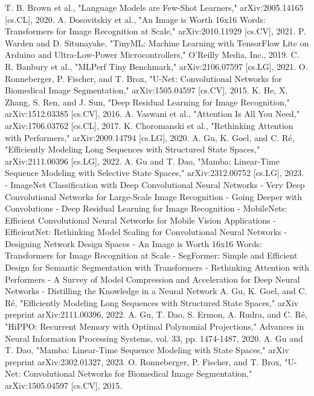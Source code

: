 \documentclass[conference]{IEEEtran}
\begin{document}
\begin{thebibliography}{00}
 T. B. Brown et al., "Language Models are Few-Shot Learners," arXiv:2005.14165 [cs.CL], 2020.
 A. Dosovitskiy et al., "An Image is Worth 16x16 Words: Transformers for Image Recognition at Scale," arXiv:2010.11929 [cs.CV], 2021.
 P. Warden and D. Situnayake, "TinyML: Machine Learning with TensorFlow Lite on Arduino and Ultra-Low-Power Microcontrollers," O'Reilly Media, Inc., 2019.
 C. R. Banbury et al., "MLPerf Tiny Benchmark," arXiv:2106.07597 [cs.LG], 2021.
 O. Ronneberger, P. Fischer, and T. Brox, "U-Net: Convolutional Networks for Biomedical Image Segmentation," arXiv:1505.04597 [cs.CV], 2015.
 K. He, X. Zhang, S. Ren, and J. Sun, "Deep Residual Learning for Image Recognition," arXiv:1512.03385 [cs.CV], 2016.
 A. Vaswani et al., "Attention Is All You Need," arXiv:1706.03762 [cs.CL], 2017.
 K. Choromanski et al., "Rethinking Attention with Performers," arXiv:2009.14794 [cs.LG], 2020.
 A. Gu, K. Goel, and C. Ré, "Efficiently Modeling Long Sequences with Structured State Spaces," arXiv:2111.00396 [cs.LG], 2022.
 A. Gu and T. Dao, "Mamba: Linear-Time Sequence Modeling with Selective State Spaces," arXiv:2312.00752 [cs.LG], 2023.
 - ImageNet Classification with Deep Convolutional Neural Networks
 - Very Deep Convolutional Networks for Large-Scale Image Recognition
 - Going Deeper with Convolutions
 - Deep Residual Learning for Image Recognition
 - MobileNets: Efficient Convolutional Neural Networks for Mobile Vision Applications
 - EfficientNet: Rethinking Model Scaling for Convolutional Neural Networks
 - Designing Network Design Spaces
 - An Image is Worth 16x16 Words: Transformers for Image Recognition at Scale
 - SegFormer: Simple and Efficient Design for Semantic Segmentation with Transformers
 - Rethinking Attention with Performers
 - A Survey of Model Compression and Acceleration for Deep Neural Networks
 - Distilling the Knowledge in a Neural Network
 A. Gu, K. Goel, and C. Ré, "Efficiently Modeling Long Sequences with Structured State Spaces," arXiv preprint arXiv:2111.00396, 2022.
 A. Gu, T. Dao, S. Ermon, A. Rudra, and C. Ré, "HiPPO: Recurrent Memory with Optimal Polynomial Projections," Advances in Neural Information Processing Systems, vol. 33, pp. 1474-1487, 2020.
 A. Gu and T. Dao, "Mamba: Linear-Time Sequence Modeling with State Spaces," arXiv preprint arXiv:2302.01327, 2023.
 O. Ronneberger, P. Fischer, and T. Brox, "U-Net: Convolutional Networks for Biomedical Image Segmentation," arXiv:1505.04597 [cs.CV], 2015.


\end{thebibliography}
\end{document}
